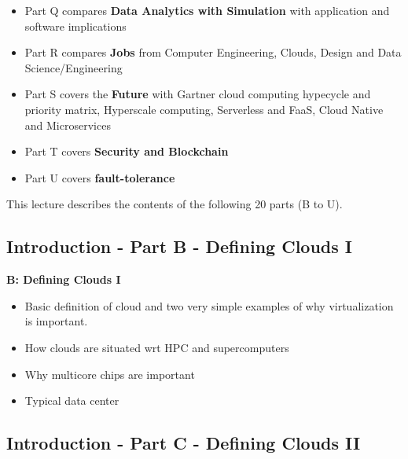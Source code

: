 \begin{itemize}
\item Part Q compares \textbf{Data Analytics with Simulation} with
  application and software implications

\item Part R compares \textbf{Jobs} from Computer Engineering, Clouds,
  Design and Data Science/Engineering

\item Part S covers the \textbf{Future} with Gartner cloud computing
  hypecycle and priority matrix, Hyperscale computing, Serverless and
  FaaS, Cloud Native and Microservices

\item Part T covers \textbf{Security and Blockchain}

\item Part U covers \textbf{fault-tolerance}

\end{itemize}


This lecture describes the contents of the following 20 parts (B to U).

\subsection{Introduction - Part B - Defining Clouds I}\label{s:cloud-fundamentals-b}


\textbf{B: Defining Clouds I}
\begin{itemize}
\item Basic definition of cloud and two very simple examples of why
  virtualization is important.
\item How clouds are situated wrt HPC and supercomputers
\item Why multicore chips are important
\item Typical data center
\end{itemize}

\subsection{Introduction - Part C -  Defining Clouds II}\label{s:cloud-fundamentals-c}


